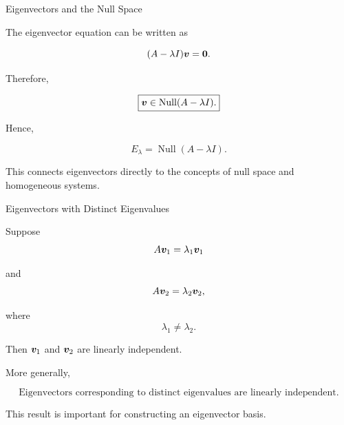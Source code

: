 
\begin{frame}{Eigenvectors and the Null Space}

The eigenvector equation can be written as

\[
(A-\lambda I)\bm{v}
=
\mathbf{0}.
\]

Therefore,

\[
\boxed{
\bm{v}
\in
\operatorname{Null}(A-\lambda I).
}
\]

Hence,

\[
\boxed{
E_{\lambda}
=
\operatorname{Null}(A-\lambda I).
}
\]

This connects eigenvectors directly to the concepts of
null space and homogeneous systems.

\end{frame}



\begin{frame}{Eigenvectors with Distinct Eigenvalues}

Suppose
\vspace{-0.1cm}
\[
A\bm{v}_1=\lambda_1\bm{v}_1
\]

and
\vspace{-0.1cm}
\[
A\bm{v}_2=\lambda_2\bm{v}_2,
\]

where
\vspace{-0.1cm}
\[
\lambda_1\neq\lambda_2.
\]

Then $\bm{v}_1$ and $\bm{v}_2$ are linearly independent.

More generally,

\[
\boxed{
\text{Eigenvectors corresponding to distinct eigenvalues
are linearly independent.}
}
\]

This result is important for constructing an eigenvector basis.

\end{frame}



